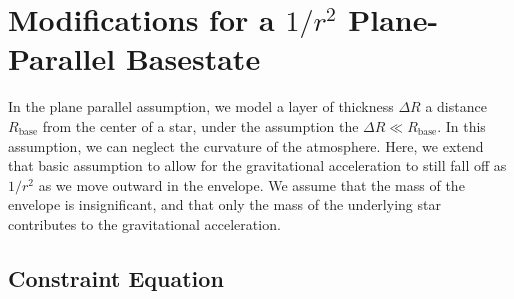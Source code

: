 
\section{\label{sec:planarinvsqgravity} Modifications for a $1/r^2$ Plane-Parallel Basestate}

In the plane parallel assumption, we model a layer of thickness
$\Delta R$ a distance $R_\mathrm{base}$ from the center of a star,
under the assumption the $\Delta R \ll R_\mathrm{base}$.  In this
assumption, we can neglect the curvature of the atmosphere.  Here, we 
extend that basic assumption to allow for the gravitational acceleration
to still fall off as $1/r^2$ as we move outward in the envelope.  We assume
that the mass of the envelope is insignificant, and that only the mass of 
the underlying star contributes to the gravitational acceleration.

\subsection{Constraint Equation}

